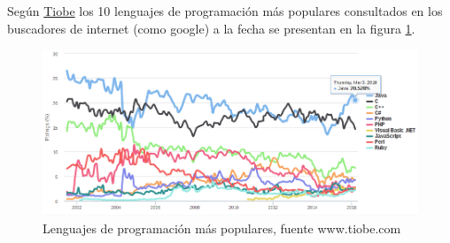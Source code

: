\documentclass{article}
\begin{document}
Según \href{http://www.tiobe.com/tiobe_index?page=index}{Tiobe} los 10
lenguajes de programación más populares consultados en los buscadores
de internet (como google) a la fecha se presentan en la figura 
\ref{fig:lenguajes1}.


\begin{figure}[hptp]
    \centering
    \includegraphics[scale=0.4]{imag/lenguajes1.png}
    \caption{Lenguajes de programación más populares, fuente www.tiobe.com}
    \label{fig:lenguajes1}
\end{figure}
\smallskip
\end{document}
